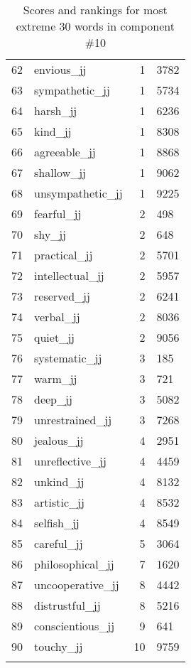 \begin{longtable}[!htbp]{| rlr@{.}l |}
    62 & envious\_jj & 1 & 3782 \\
    63 & sympathetic\_jj & 1 & 5734 \\
    64 & harsh\_jj & 1 & 6236 \\
    65 & kind\_jj & 1 & 8308 \\
    66 & agreeable\_jj & 1 & 8868 \\
    67 & shallow\_jj & 1 & 9062 \\
    68 & unsympathetic\_jj & 1 & 9225 \\
    69 & fearful\_jj & 2 & 498 \\
    70 & shy\_jj & 2 & 648 \\
    71 & practical\_jj & 2 & 5701 \\
    72 & intellectual\_jj & 2 & 5957 \\
    73 & reserved\_jj & 2 & 6241 \\
    74 & verbal\_jj & 2 & 8036 \\
    75 & quiet\_jj & 2 & 9056 \\
    76 & systematic\_jj & 3 & 185 \\
    77 & warm\_jj & 3 & 721 \\
    78 & deep\_jj & 3 & 5082 \\
    79 & unrestrained\_jj & 3 & 7268 \\
    80 & jealous\_jj & 4 & 2951 \\
    81 & unreflective\_jj & 4 & 4459 \\
    82 & unkind\_jj & 4 & 8132 \\
    83 & artistic\_jj & 4 & 8532 \\
    84 & selfish\_jj & 4 & 8549 \\
    85 & careful\_jj & 5 & 3064 \\
    86 & philosophical\_jj & 7 & 1620 \\
    87 & uncooperative\_jj & 8 & 4442 \\
    88 & distrustful\_jj & 8 & 5216 \\
    89 & conscientious\_jj & 9 & 641 \\
    90 & touchy\_jj & 10 & 9759 \\
    \hline
    \caption{Scores and rankings for most extreme 30 words in component \#10} \\
\end{longtable}
